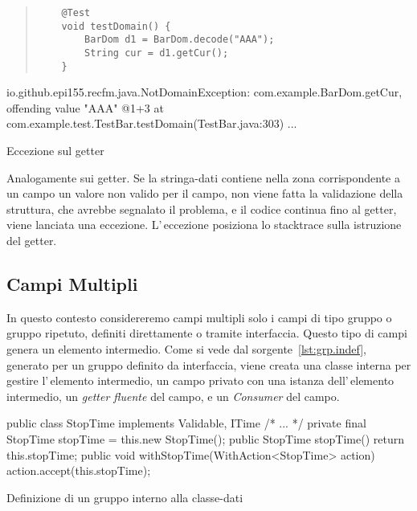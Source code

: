 \begin{elisting}[!htb]
\begin{quote}
\begin{verbatim}
    @Test
    void testDomain() {
        BarDom d1 = BarDom.decode("AAA");
        String cur = d1.getCur();
    }
\end{verbatim}
\end{quote}
\vspace*{-1cm}
\begin{javacode}
io.github.epi155.recfm.java.NotDomainException: com.example.BarDom.getCur, offending value "AAA" @1+3
	at com.example.test.TestBar.testDomain(TestBar.java:303)
	...
\end{javacode}
\caption{Eccezione sul getter}
\label{lst:get.throw}
\end{elisting}
Analogamente sui getter. Se la stringa-dati contiene nella zona corrispondente 
a un campo un valore non valido per il campo, non viene fatta la validazione 
della struttura, che avrebbe segnalato il problema, e il codice continua fino 
al getter, viene lanciata una eccezione.
L'\,eccezione posiziona lo stacktrace sulla istruzione del getter.

\subsection{Campi Multipli}
In questo contesto considereremo campi multipli solo i campi di tipo gruppo o
gruppo ripetuto, definiti direttamente o tramite interfaccia.
Questo tipo di campi genera un elemento intermedio.
Come si vede dal sorgente~\ref{lst:grp.indef}, generato per un gruppo definito
da interfaccia, viene creata una classe interna per gestire l'\,elemento 
intermedio, un campo privato con una istanza dell'\,elemento intermedio, un
\textit{getter fluente} del campo, e un \textit{Consumer} del campo.

\begin{elisting}[!htb]
\begin{javacode}
    public class StopTime implements Validable, ITime {/* ... */}
    private final StopTime stopTime = this.new StopTime();
    public StopTime stopTime() { return this.stopTime; }
    public void withStopTime(WithAction<StopTime> action) { action.accept(this.stopTime); }
\end{javacode}
\caption{Definizione di un gruppo interno alla classe-dati}
\label{lst:grp.indef}
\end{elisting}

